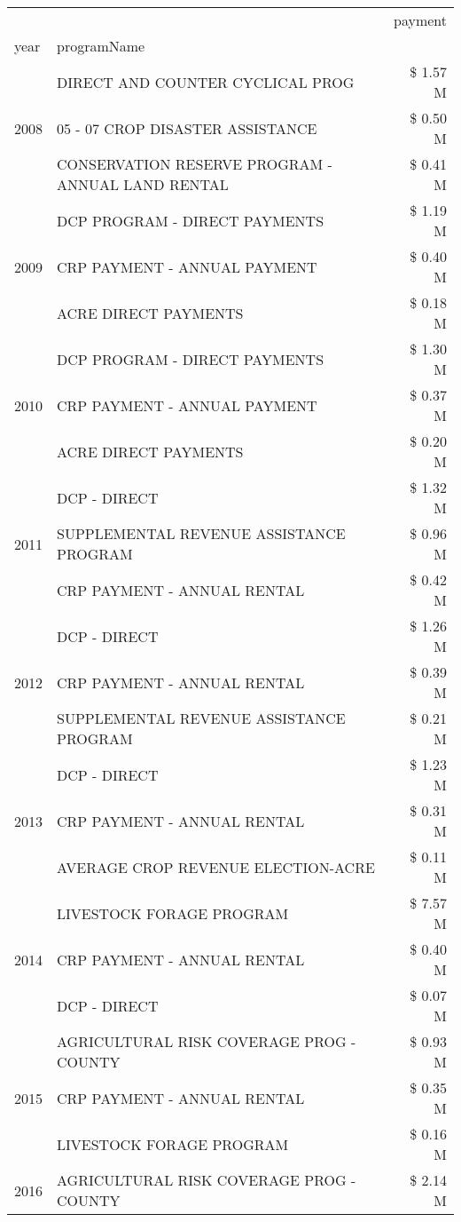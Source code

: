 \begin{tabular}{llr}
\toprule
 &  & payment \\
year & programName &  \\
\midrule
\multirow[t]{3}{*}{2008} & DIRECT AND COUNTER CYCLICAL PROG & \$ 1.57 M \\
 & 05 - 07 CROP DISASTER ASSISTANCE & \$ 0.50 M \\
 & CONSERVATION RESERVE PROGRAM - ANNUAL LAND RENTAL & \$ 0.41 M \\
\cline{1-3}
\multirow[t]{3}{*}{2009} & DCP PROGRAM - DIRECT PAYMENTS & \$ 1.19 M \\
 & CRP PAYMENT - ANNUAL PAYMENT & \$ 0.40 M \\
 & ACRE DIRECT PAYMENTS & \$ 0.18 M \\
\cline{1-3}
\multirow[t]{3}{*}{2010} & DCP PROGRAM - DIRECT PAYMENTS & \$ 1.30 M \\
 & CRP PAYMENT - ANNUAL PAYMENT & \$ 0.37 M \\
 & ACRE DIRECT PAYMENTS & \$ 0.20 M \\
\cline{1-3}
\multirow[t]{3}{*}{2011} & DCP - DIRECT & \$ 1.32 M \\
 & SUPPLEMENTAL REVENUE ASSISTANCE PROGRAM & \$ 0.96 M \\
 & CRP PAYMENT - ANNUAL RENTAL & \$ 0.42 M \\
\cline{1-3}
\multirow[t]{3}{*}{2012} & DCP - DIRECT & \$ 1.26 M \\
 & CRP PAYMENT - ANNUAL RENTAL & \$ 0.39 M \\
 & SUPPLEMENTAL REVENUE ASSISTANCE PROGRAM & \$ 0.21 M \\
\cline{1-3}
\multirow[t]{3}{*}{2013} & DCP - DIRECT & \$ 1.23 M \\
 & CRP PAYMENT - ANNUAL RENTAL & \$ 0.31 M \\
 & AVERAGE CROP REVENUE ELECTION-ACRE & \$ 0.11 M \\
\cline{1-3}
\multirow[t]{3}{*}{2014} & LIVESTOCK FORAGE PROGRAM & \$ 7.57 M \\
 & CRP PAYMENT - ANNUAL RENTAL & \$ 0.40 M \\
 & DCP - DIRECT & \$ 0.07 M \\
\cline{1-3}
\multirow[t]{3}{*}{2015} & AGRICULTURAL RISK COVERAGE PROG - COUNTY & \$ 0.93 M \\
 & CRP PAYMENT - ANNUAL RENTAL & \$ 0.35 M \\
 & LIVESTOCK FORAGE PROGRAM & \$ 0.16 M \\
\cline{1-3}
\multirow[t]{3}{*}{2016} & AGRICULTURAL RISK COVERAGE PROG - COUNTY & \$ 2.14 M \\

\end{tabular}
